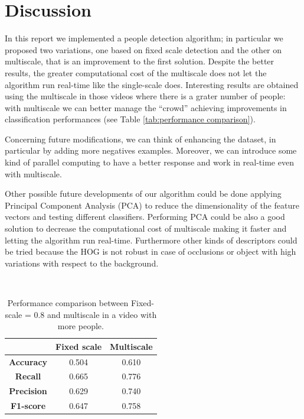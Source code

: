 \documentclass[a4paper,letterpaper, 11pt, onecolumn]{article} %
\begin{document}
\section{Discussion}\label{discussion}
In this report we implemented a people detection algorithm; in particular we proposed two variations, one based on fixed scale detection and the other on multiscale, that is an improvement to the first solution. Despite the better results, the greater computational cost of the multiscale does not let the algorithm run real-time like the single-scale does. 
Interesting results are obtained using the multiscale in those videos where there is a grater number of people: with multiscale we can better manage the ``crowd'' achieving improvements in classification performances (see Table \ref{tab:performance comparison}).


Concerning future modifications, we can think of enhancing the dataset, in particular by adding more negatives examples. Moreover, we can introduce some kind of parallel computing to have a better response and work in real-time even with multiscale. 

Other possible future developments of our algorithm could be done applying Principal Component Analysis (PCA) to reduce the dimensionality of the feature vectors and testing different classifiers. Performing PCA could be also a good solution to decrease the computational cost of multiscale making it faster and letting the algorithm run real-time. Furthermore other kinds of descriptors could be tried because the HOG is not robust in case of occlusions or object with high variations with respect to the background.

\
\begin{table}[h!]
\centering
\begin{tabular}{c||c|c}
&\textbf{Fixed scale} & \textbf{Multiscale}\\
\hline \hline 
\textbf{Accuracy} &0.504 & 0.610\\
\textbf{Recall} &0.665  & 0.776\\
\textbf{Precision} & 0.629 &  0.740\\
\textbf{F1-score} & 0.647& 0.758\\
\end{tabular}
\caption{Performance comparison between Fixed-scale = 0.8 and multiscale in a video with more people.}
\label{tab:performance compairson}
\end{table}
\end{document}
